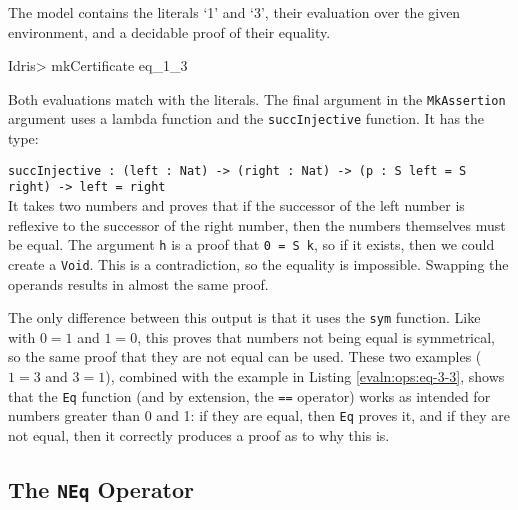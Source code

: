         \newpage
        
        
        The model contains the literals `1' and `3', their evaluation over the given environment, and a decidable proof of their equality.
        
        \begin{code}
Idris> mkCertificate eq_1_3
        \end{code}
        
        Both evaluations match with the literals. The final argument in the \texttt{MkAssertion} argument uses a lambda function and the \texttt{succInjective} function. It has the type:\par
        \texttt{succInjective : (left : Nat) -> (right : Nat) -> (p : S left = S right) -> left = right}\\
        It takes two numbers and proves that if the successor of the left number is reflexive to the successor of the right number, then the numbers themselves must be equal. The argument \texttt{h} is a proof that \texttt{0 = S k}, so if it exists, then we could create a \texttt{Void}. This is a contradiction, so the equality is impossible. Swapping the operands results in almost the same proof.
        
        \newpage
        
        
        The only difference between this output is that it uses the \texttt{sym} function. Like with $0 = 1$ and $1 = 0$, this proves that numbers not being equal is symmetrical, so the same proof that they are not equal can be used. These two examples ($1 = 3$ and $3 = 1$), combined with the example in Listing \ref{evaln:ops:eq-3-3}, shows that the \texttt{Eq} function (and by extension, the \texttt{==} operator) works as intended for numbers greater than 0 and 1: if they are equal, then \texttt{Eq} proves it, and if they are not equal, then it correctly produces a proof as to why this is.
    
    \subsection{The \texttt{NEq} Operator}\label{evaln:ops:neq}
        
        
